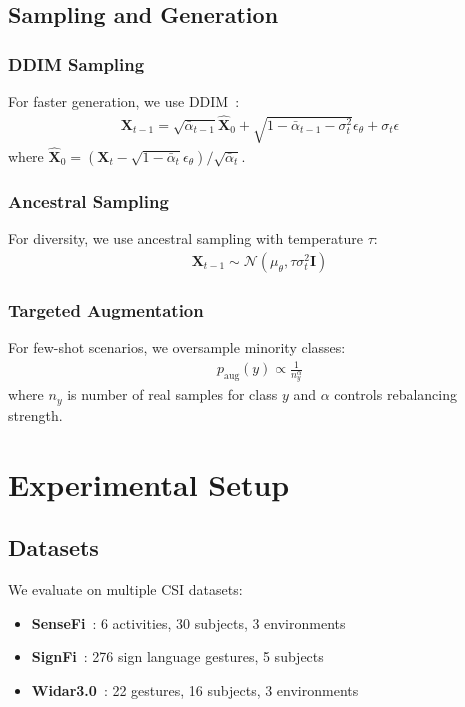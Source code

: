 \documentclass[journal]{IEEEtran}
\begin{document}
\subsection{Sampling and Generation}

\subsubsection{DDIM Sampling}
For faster generation, we use DDIM~\cite{song2021denoising}:
\begin{align}
\mathbf{X}_{t-1} = \sqrt{\bar{\alpha}_{t-1}}\hat{\mathbf{X}}_0 + \sqrt{1-\bar{\alpha}_{t-1}-\sigma_t^2}\epsilon_\theta + \sigma_t\epsilon
\end{align}
where $\hat{\mathbf{X}}_0 = (\mathbf{X}_t - \sqrt{1-\bar{\alpha}_t}\epsilon_\theta)/\sqrt{\bar{\alpha}_t}$.

\subsubsection{Ancestral Sampling}
For diversity, we use ancestral sampling with temperature $\tau$:
\begin{align}
\mathbf{X}_{t-1} \sim \mathcal{N}(\mu_\theta, \tau\sigma_t^2\mathbf{I})
\end{align}

\subsubsection{Targeted Augmentation}
For few-shot scenarios, we oversample minority classes:
\begin{align}
p_{\text{aug}}(y) \propto \frac{1}{n_y^\alpha}
\end{align}
where $n_y$ is number of real samples for class $y$ and $\alpha$ controls rebalancing strength.

\section{Experimental Setup}

\subsection{Datasets}

We evaluate on multiple CSI datasets:
\begin{itemize}
\item \textbf{SenseFi}~\cite{yang2023sensefi}: 6 activities, 30 subjects, 3 environments
\item \textbf{SignFi}~\cite{ma2018signfi}: 276 sign language gestures, 5 subjects
\item \textbf{Widar3.0}~\cite{zheng2019widar}: 22 gestures, 16 subjects, 3 environments
\end{itemize}
\end{document}
